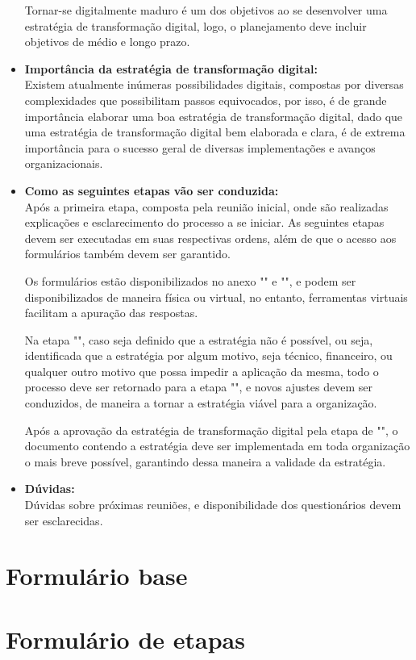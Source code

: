 \begin{itemize}
    Tornar-se digitalmente maduro é um dos objetivos ao se desenvolver uma estratégia de transformação digital, logo, o planejamento deve incluir objetivos de médio e longo prazo.
    
    \item \textbf{Importância da estratégia de transformação digital:}\\
    Existem atualmente inúmeras possibilidades digitais, compostas por diversas complexidades que possibilitam passos equivocados, por isso, é de grande importância elaborar uma boa estratégia de transformação digital, dado que uma estratégia de transformação digital bem elaborada e clara, é de extrema importância para o sucesso geral de diversas implementações e avanços organizacionais.
    
    \item \textbf{Como as seguintes etapas vão ser conduzida:}\\
    Após a primeira etapa, composta pela reunião inicial, onde são realizadas explicações e esclarecimento do processo a se iniciar. As seguintes etapas devem ser executadas em suas respectivas ordens, além de que o acesso aos formulários também devem ser garantido.
    
    Os formulários estão disponibilizados no anexo "" e "", e podem ser disponibilizados de maneira física ou virtual, no entanto, ferramentas virtuais facilitam a apuração das respostas.
    
    Na etapa "", caso seja definido que a estratégia não é possível, ou seja, identificada que a estratégia por algum motivo, seja técnico, financeiro, ou qualquer outro motivo que possa impedir a aplicação da mesma, todo o processo deve ser retornado para a etapa "", e novos ajustes devem ser conduzidos, de maneira a tornar a estratégia viável para a organização.
    
    Após a aprovação da estratégia de transformação digital pela etapa de "", o documento contendo a estratégia deve ser implementada em toda organização o mais breve possível, garantindo dessa maneira a validade da estratégia.
    
    
    \item \textbf{Dúvidas:}\\
    Dúvidas sobre próximas reuniões, e disponibilidade dos questionários devem ser esclarecidas.
\end{itemize}


\section*{Formulário base}\label{sec:formBase}




\section*{Formulário de etapas}\label{sec:formEtapas}

